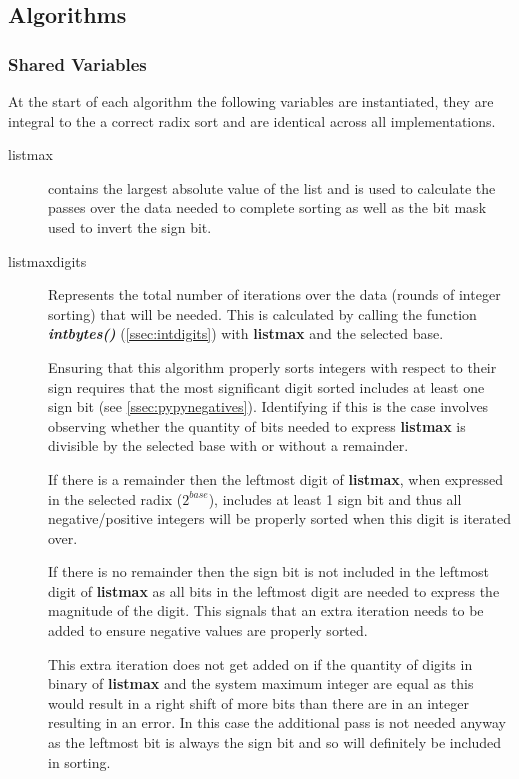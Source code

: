\documentclass[12pt]{article}
\begin{document}
\pagebreak
\subsection{Algorithms}
\label{ssec:algorithms}
\subsubsection{Shared Variables}
At the start of each algorithm the following variables are instantiated, they are integral to the a correct radix sort and are identical across all implementations.
\begin{description}
	\item[listmax]contains the largest absolute value of the list and is used to calculate the passes over the data needed to complete sorting as well as the bit mask used to invert the sign bit.
 	\item[list\textunderscore max\textunderscore digits] 
	\label{sssec:listmaxdigits} Represents the total number of iterations over the data (rounds of integer sorting) that will be needed. This is calculated by calling the function \textbf{\textit{int\textunderscore bytes()}} (\ref{ssec:intdigits}) with \textbf{list\textunderscore max} and the selected base.
	\par
	Ensuring that this algorithm properly sorts integers with respect to their sign requires that the most significant digit sorted includes at least one sign bit (see \ref{ssec:pypynegatives}). Identifying if this is the case involves observing whether the quantity of bits needed to express \textbf{list\textunderscore max} is divisible by the selected base with or without a remainder.
	\par 
	If there is a remainder then the leftmost digit of \textbf{list\textunderscore max}, when expressed in the selected radix ($2^{base}$), includes at least 1 sign bit and thus all negative/positive integers will be properly sorted when this digit is iterated over.
	\par
	If there is no remainder then the sign bit is not included in the leftmost digit of \textbf{list\textunderscore max} as all bits in the leftmost digit are needed to express the magnitude of the digit. This signals that an extra iteration needs to be added to ensure negative values are properly sorted.
	\par
	This extra iteration does not get added on if the quantity of digits in binary of \textbf{list\textunderscore max} and the system maximum integer are equal as this would result in a right shift of more bits than there are in an integer resulting in an error. In this case the additional pass is not needed anyway as the leftmost bit is always the sign bit and so will definitely be included in sorting.

\end{description}
\end{document}
